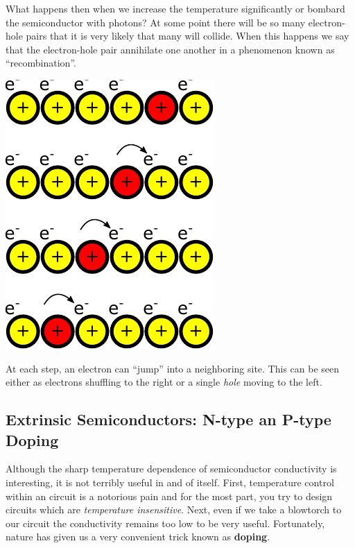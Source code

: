 \documentclass{tufte-book}
\begin{document}
What happens then when we increase the temperature significantly or bombard the semiconductor with photons? At some point there will be so many electron-hole pairs that it is very likely that many will collide. When this happens we say that the electron-hole pair annihilate one another in a phenomenon known as ``recombination''.

\begin{marginfigure}%
  \includegraphics[]{jumpin_hole}
  \caption{At each step, an electron can ``jump'' into a neighboring site. This can be seen either as electrons shuffling to the right or a single \textit{hole} moving to the left.}
  \label{fig:olez}
\end{marginfigure}

\subsection{Extrinsic Semiconductors: N-type an P-type Doping}
Although the sharp temperature dependence of semiconductor conductivity is interesting, it is not terribly useful in and of itself. First, temperature control within an circuit is a notorious pain and for the most part, you try to design circuits which are \textit{temperature insensitive}. Next, even if we take a blowtorch to our circuit the conductivity remains too low to be very useful. Fortunately, nature has given us a very convenient trick known as \textbf{doping}.
\end{document}
